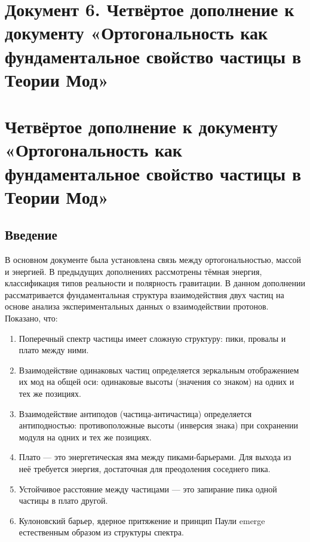 \documentclass[12pt,a4paper]{article}
\begin{document}

\newpage
\section*{Документ 6. Четвёртое дополнение к документу «Ортогональность как фундаментальное свойство частицы в Теории Мод»}

\section{Четвёртое дополнение к документу «Ортогональность как фундаментальное свойство частицы в Теории Мод»}

\subsection{Введение}
В основном документе была установлена связь между ортогональностью, массой и энергией. В предыдущих дополнениях рассмотрены тёмная энергия, классификация типов реальности и полярность гравитации. В данном дополнении рассматривается фундаментальная структура взаимодействия двух частиц на основе анализа экспериментальных данных о взаимодействии протонов. Показано, что:

\begin{enumerate}[label=\arabic*.]
    \item Поперечный спектр частицы имеет сложную структуру: пики, провалы и плато между ними.
    \item Взаимодействие одинаковых частиц определяется зеркальным отображением их мод на общей оси: одинаковые высоты (значения со знаком) на одних и тех же позициях.
    \item Взаимодействие антиподов (частица-античастица) определяется антиподностью: противоположные высоты (инверсия знака) при сохранении модуля на одних и тех же позициях.
    \item Плато --- это энергетическая яма между пиками-барьерами. Для выхода из неё требуется энергия, достаточная для преодоления соседнего пика.
    \item Устойчивое расстояние между частицами --- это запирание пика одной частицы в плато другой.
    \item Кулоновский барьер, ядерное притяжение и принцип Паули emerge естественным образом из структуры спектра.
\end{enumerate}
\end{document}
